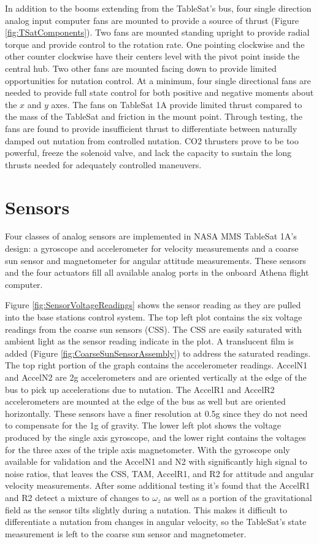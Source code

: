 In addition to the booms extending from the TableSat's bus, four single direction analog input computer fans are mounted to provide a source of thrust (Figure \ref{fig:TSatComponents}).  Two fans are mounted standing upright to provide radial torque and provide control to the rotation rate.  One pointing clockwise and the other counter clockwise have their centers level with the pivot point inside the central hub.  Two other fans are mounted facing down to provide limited opportunities for nutation control.  At a minimum, four single directional fans are needed to provide full state control for both positive and negative moments about the $x$ and $y$ axes.  The fans on TableSat 1A provide limited thrust compared to the mass of the TableSat and friction in the mount point.  Through testing, the fans are found to provide insufficient thrust to differentiate between naturally damped out nutation from controlled nutation.  CO2 thrusters prove to be too powerful, freeze the solenoid valve, and lack the capacity to sustain the long thrusts needed for adequately controlled maneuvers.

\section{Sensors}
\label{sec:Sensors}

Four classes of analog sensors are implemented in NASA MMS TableSat 1A's design: a gyroscope and accelerometer for velocity measurements and a coarse sun sensor and magnetometer for angular attitude measurements.  These sensors and the four actuators fill all available analog ports in the onboard Athena flight computer.

Figure \ref{fig:SensorVoltageReadings} shows the sensor reading as they are pulled into the base stations control system.  The top left plot contains the six voltage readings from the coarse sun sensors (CSS).  The CSS are easily saturated with ambient light as the sensor reading indicate in the plot.  A translucent film is added (Figure \ref{fig:CoarseSunSensorAssembly}) to address the saturated readings.  The top right portion of the graph contains the accelerometer readings.  AccelN1 and AccelN2 are 2g accelerometers and are oriented vertically at the edge of the bus to pick up accelerations due to nutation.  The AccelR1 and AccelR2 accelerometers are mounted at the edge of the bus as well but are oriented horizontally.  These sensors have a finer resolution at 0.5g since they do not need to compensate for the 1g of gravity.  The lower left plot shows the voltage produced by the single axis gyroscope, and the lower right contains the voltages for the three axes of the triple axis magnetometer.  With the gyroscope only available for validation and the AccelN1 and N2 with significantly high signal to noise ratios, that leaves the CSS, TAM, AccelR1, and R2 for attitude and angular velocity measurements.  After some additional testing it's found that the AccelR1 and R2 detect a mixture of changes to $\omega_z$ as well as a portion of the gravitational field as the sensor tilts slightly during a nutation.  This makes it difficult to differentiate a nutation from changes in angular velocity, so the TableSat's state measurement is left to the coarse sun sensor and magnetometer.

